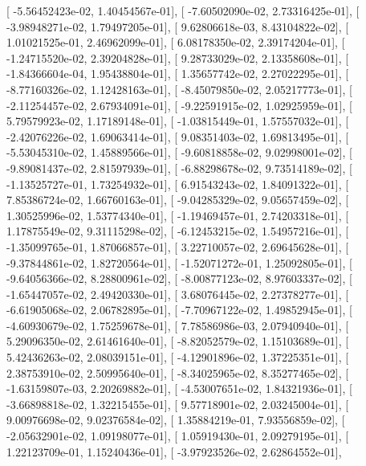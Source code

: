 \documentclass{article}
\begin{document}
       [ -5.56452423e-02,   1.40454567e-01],
       [ -7.60502090e-02,   2.73316425e-01],
       [ -3.98948271e-02,   1.79497205e-01],
       [  9.62806618e-03,   8.43104822e-02],
       [  1.01021525e-01,   2.46962099e-01],
       [  6.08178350e-02,   2.39174204e-01],
       [ -1.24715520e-02,   2.39204828e-01],
       [  9.28733029e-02,   2.13358608e-01],
       [ -1.84366604e-04,   1.95438804e-01],
       [  1.35657742e-02,   2.27022295e-01],
       [ -8.77160326e-02,   1.12428163e-01],
       [ -8.45079850e-02,   2.05217773e-01],
       [ -2.11254457e-02,   2.67934091e-01],
       [ -9.22591915e-02,   1.02925959e-01],
       [  5.79579923e-02,   1.17189148e-01],
       [ -1.03815449e-01,   1.57557032e-01],
       [ -2.42076226e-02,   1.69063414e-01],
       [  9.08351403e-02,   1.69813495e-01],
       [ -5.53045310e-02,   1.45889566e-01],
       [ -9.60818858e-02,   9.02998001e-02],
       [ -9.89081437e-02,   2.81597939e-01],
       [ -6.88298678e-02,   9.73514189e-02],
       [ -1.13525727e-01,   1.73254932e-01],
       [  6.91543243e-02,   1.84091322e-01],
       [  7.85386724e-02,   1.66760163e-01],
       [ -9.04285329e-02,   9.05657459e-02],
       [  1.30525996e-02,   1.53774340e-01],
       [ -1.19469457e-01,   2.74203318e-01],
       [  1.17875549e-02,   9.31115298e-02],
       [ -6.12453215e-02,   1.54957216e-01],
       [ -1.35099765e-01,   1.87066857e-01],
       [  3.22710057e-02,   2.69645628e-01],
       [ -9.37844861e-02,   1.82720564e-01],
       [ -1.52071272e-01,   1.25092805e-01],
       [ -9.64056366e-02,   8.28800961e-02],
       [ -8.00877123e-02,   8.97603337e-02],
       [ -1.65447057e-02,   2.49420330e-01],
       [  3.68076445e-02,   2.27378277e-01],
       [ -6.61905068e-02,   2.06782895e-01],
       [ -7.70967122e-02,   1.49852945e-01],
       [ -4.60930679e-02,   1.75259678e-01],
       [  7.78586986e-03,   2.07940940e-01],
       [  5.29096350e-02,   2.61461640e-01],
       [ -8.82052579e-02,   1.15103689e-01],
       [  5.42436263e-02,   2.08039151e-01],
       [ -4.12901896e-02,   1.37225351e-01],
       [  2.38753910e-02,   2.50995640e-01],
       [ -8.34025965e-02,   8.35277465e-02],
       [ -1.63159807e-03,   2.20269882e-01],
       [ -4.53007651e-02,   1.84321936e-01],
       [ -3.66898818e-02,   1.32215455e-01],
       [  9.57718901e-02,   2.03245004e-01],
       [  9.00976698e-02,   9.02376584e-02],
       [  1.35884219e-01,   7.93556859e-02],
       [ -2.05632901e-02,   1.09198077e-01],
       [  1.05919430e-01,   2.09279195e-01],
       [  1.22123709e-01,   1.15240436e-01],
       [ -3.97923526e-02,   2.62864552e-01],
\end{document}
